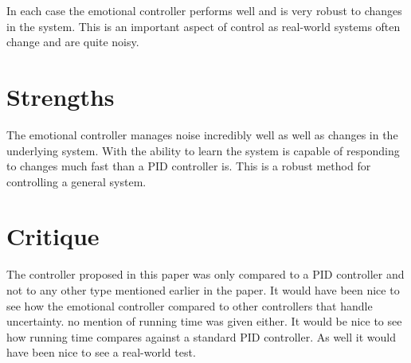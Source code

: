 \documentclass{article}
\begin{document}
In each case the emotional controller performs well and is very robust to changes in the system. This is an important aspect of control as real-world systems often change and are quite noisy.
\section*{Strengths}
The emotional controller manages noise incredibly well as well as changes in the underlying system. With the ability to learn the system is capable of responding to changes much fast than a PID controller is. This is a robust method for controlling a general system.
\section*{Critique}
The controller proposed in this paper was only compared to a PID controller and not to any other type mentioned earlier in the paper. It would have been nice to see how the emotional controller compared to other controllers that handle uncertainty. no mention of running time was given either. It would be nice to see how running time compares against a standard PID controller. As well it would have been nice to see a real-world test.
\cite{doi:10.1080/10798587.2004.10642862}
\end{document}
